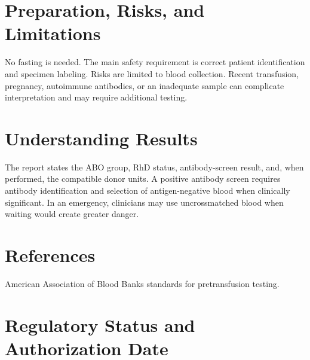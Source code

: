 \section*{Preparation, Risks, and Limitations}
No fasting is needed. The main safety requirement is correct patient identification and specimen labeling. Risks are limited to blood collection. Recent transfusion, pregnancy, autoimmune antibodies, or an inadequate sample can complicate interpretation and may require additional testing.

\section*{Understanding Results}
The report states the ABO group, RhD status, antibody-screen result, and, when performed, the compatible donor units. A positive antibody screen requires antibody identification and selection of antigen-negative blood when clinically significant. In an emergency, clinicians may use uncrossmatched blood when waiting would create greater danger.

\section*{References}
American Association of Blood Banks standards for pretransfusion testing.

\clearpage


\section*{Regulatory Status and Authorization Date}

\clearpage
